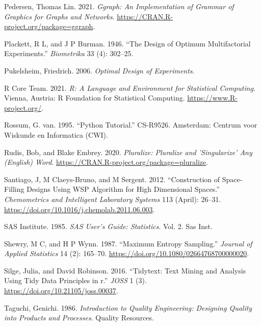 \documentclass{article}
\newlength{\cslhangindent}
\newlength{\cslentryspacingunit} %
\newenvironment{CSLReferences}[2] %
 {%
  \setlength{\parindent}{0pt}
  \ifodd #1
  \let\oldpar\par
  \def\par{\hangindent=\cslhangindent\oldpar}
  \fi
  \setlength{\parskip}{#2\cslentryspacingunit}
 }%
 {}
\begin{document}
\begin{CSLReferences}{1}{0}
\leavevmode{}%
Pedersen, Thomas Lin. 2021. \emph{Ggraph: An Implementation of Grammar
of Graphics for Graphs and Networks}.
\url{https://CRAN.R-project.org/package=ggraph}.

\leavevmode{}%
Plackett, R L, and J P Burman. 1946. {``The Design of Optimum
Multifactorial Experiments.''} \emph{Biometrika} 33 (4): 302--25.

\leavevmode{}%
Pukelsheim, Friedrich. 2006. \emph{Optimal Design of Experiments}.

\leavevmode{}%
R Core Team. 2021. \emph{R: A Language and Environment for Statistical
Computing}. Vienna, Austria: R Foundation for Statistical Computing.
\url{https://www.R-project.org/}.

\leavevmode{}%
Rossum, G. van. 1995. {``Python Tutorial.''} CS-R9526. Amsterdam:
Centrum voor Wiskunde en Informatica (CWI).

\leavevmode{}%
Rudis, Bob, and Blake Embrey. 2020. \emph{Pluralize: Pluralize and
'Singularize' Any (English) Word}.
\url{https://CRAN.R-project.org/package=pluralize}.

\leavevmode{}%
Santiago, J, M Claeys-Bruno, and M Sergent. 2012. {``Construction of
Space-Filling Designs Using {WSP} Algorithm for High Dimensional
Spaces.''} \emph{Chemometrics and Intelligent Laboratory Systems} 113
(April): 26--31. \url{https://doi.org/10.1016/j.chemolab.2011.06.003}.

\leavevmode{}%
SAS Institute. 1985. \emph{SAS User's Guide: Statistics}. Vol. 2. Sas
Inst.

\leavevmode{}%
Shewry, M C, and H P Wynn. 1987. {``Maximum Entropy Sampling.''}
\emph{Journal of Applied Statistics} 14 (2): 165--70.
\url{https://doi.org/10.1080/02664768700000020}.

\leavevmode{}%
Silge, Julia, and David Robinson. 2016. {``Tidytext: Text Mining and
Analysis Using Tidy Data Principles in r.''} \emph{JOSS} 1 (3).
\url{https://doi.org/10.21105/joss.00037}.

\leavevmode{}%
Taguchi, Genichi. 1986. \emph{Introduction to Quality Engineering:
Designing Quality into Products and Processes}. Quality Resources.


\end{CSLReferences}
\end{document}

